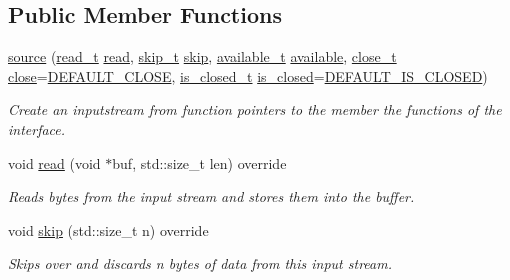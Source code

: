 \subsection*{Public Member Functions}
\begin{DoxyCompactItemize}
\item 
\hyperlink{structdevfix_1_1base_1_1io_1_1source_af8bef20f5b54153c3fd1fbc7daa263c5}{source} (\hyperlink{namespacedevfix_1_1base_1_1io_ae311e0a7c5c8f064e222933e152aff64}{read\+\_\+t} \hyperlink{structdevfix_1_1base_1_1io_1_1source_a9fbd4d20aa150910ced44018e1b3156a}{read}, \hyperlink{namespacedevfix_1_1base_1_1io_aeb8f94d85cfeaa405f53a6967e609645}{skip\+\_\+t} \hyperlink{structdevfix_1_1base_1_1io_1_1source_a21cb579307589cbc6f9e02d64c66f4b2}{skip}, \hyperlink{namespacedevfix_1_1base_1_1io_a19c1195ab6a44e6d4f48b86062860a11}{available\+\_\+t} \hyperlink{structdevfix_1_1base_1_1io_1_1source_a911f4ba79499a623de30cf16d3d26d47}{available}, \hyperlink{namespacedevfix_1_1base_1_1io_ae3118387742e5f4d484a328a213d6a5d}{close\+\_\+t} \hyperlink{structdevfix_1_1base_1_1io_1_1source_aa00a381c8a166cbbc5dbf6de4b56590e}{close}=\hyperlink{namespacedevfix_1_1base_1_1io_a14a286c17d4b93881d42b1d14beb2d0b}{D\+E\+F\+A\+U\+L\+T\+\_\+\+C\+L\+O\+SE}, \hyperlink{namespacedevfix_1_1base_1_1io_a14f89d4437ced6ede49c044ee8e71f17}{is\+\_\+closed\+\_\+t} \hyperlink{structdevfix_1_1base_1_1io_1_1source_a406834cf6651d48949b96d0ef49cc6c1}{is\+\_\+closed}=\hyperlink{namespacedevfix_1_1base_1_1io_ae04fec2a2a2db3482e624a59e59a2a14}{D\+E\+F\+A\+U\+L\+T\+\_\+\+I\+S\+\_\+\+C\+L\+O\+S\+ED})
\begin{DoxyCompactList}\small\item\em Create an {\itshape inputstream} from function pointers to the member the functions of the interface. \end{DoxyCompactList}\item 
void \hyperlink{structdevfix_1_1base_1_1io_1_1source_a9fbd4d20aa150910ced44018e1b3156a}{read} (void $\ast$buf, std\+::size\+\_\+t len) override
\begin{DoxyCompactList}\small\item\em Reads bytes from the input stream and stores them into the buffer. \end{DoxyCompactList}\item 
void \hyperlink{structdevfix_1_1base_1_1io_1_1source_a21cb579307589cbc6f9e02d64c66f4b2}{skip} (std\+::size\+\_\+t n) override
\begin{DoxyCompactList}\small\item\em Skips over and discards n bytes of data from this input stream. \end{DoxyCompactList}\item 

\end{DoxyCompactItemize}
